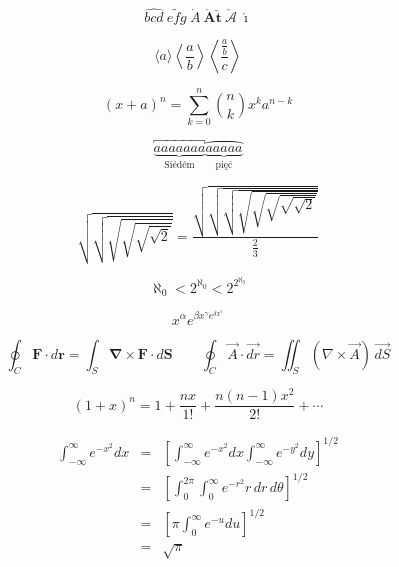 \pagestyle{empty}

\begin{displaymath}
  \widehat{bcd} \ \widetilde{efg} \ \dot A \ \mathbf{\dot A \check t} 
  \ \check{\mathcal{A}}
  \ \mathbf{\acute \imath}
\end{displaymath}

\begin{displaymath}
  \langle a \rangle \left\langle \frac{a}{b} \right\rangle
  \left\langle \frac{\frac{a}{b}}{c} \right\rangle
\end{displaymath}

\begin{displaymath}
  (x + a)^n = \sum_{k=0}^n {n \choose k} x^k a^{n-k}
\end{displaymath}

\begin{displaymath}
 \underbrace{\overbracket{aaaaaaa}}_\text{Siédém}
 \underbrace{\overparen{aaaaa}}_\text{pięć}
\end{displaymath}

\begin{displaymath}
 \sqrt{\sqrt{\sqrt{\sqrt{\sqrt{\sqrt{2}}}}}} =
 \frac{\sqrt{\sqrt{\sqrt{\sqrt{\sqrt{\sqrt{\sqrt{\sqrt{2}}}}}}}}}{\frac{2}{3}}
\end{displaymath}

\begin{displaymath}
 \aleph_{0}<2^{\aleph_0}<2^{2^{\aleph_0}}
\end{displaymath}

\begin{displaymath}
x^{\alpha} e^{\beta x^{\gamma} e^{\delta x^{\epsilon}}}
\end{displaymath}

\begin{displaymath}
 \oint_C\mathbf{F}\cdot d\mathbf{r}=\int_S\mathbf{\nabla}\times\mathbf{F}\cdot d\mathbf{S}\qquad
 \oint_C\vec{A}\cdot\vec{dr}=\iint_S(\nabla\times\vec{A})\,\vec{dS}
\end{displaymath}

\begin{displaymath}
 (1+x)^n=1+\frac{nx}{1!}+\frac{n(n-1)x^2}{2!}+\cdots
\end{displaymath}

\setlength\arraycolsep{0.15em}
\begin{eqnarray*}
 \int_{-\infty}^\infty e^{-x^2}dx &=& \left[\int_{-\infty}^\infty e^{-x^2}dx
  \int_{-\infty}^\infty e^{-y^2}dy\right]^{1/2}\\
 &=& \left[\int_{0}^{2\pi} \int_0^\infty e^{-r^2}r\,dr\,d\theta\right]^{1/2}\\
 &=& \left[\pi\int_{0}^\infty e^{-u}du\right]^{1/2}\\
 &=& \sqrt{\pi}
\end{eqnarray*}

\endinput
